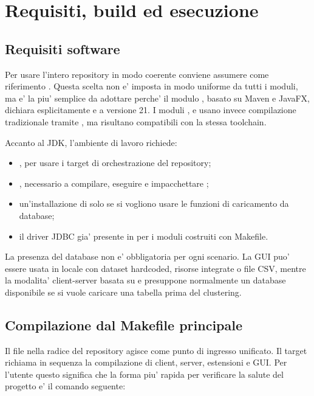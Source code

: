 \chapter{Requisiti, build ed esecuzione}
\label{chap:build}

\section{Requisiti software}

Per usare l'intero repository in modo coerente conviene assumere come riferimento
. Questa scelta non e' imposta in modo uniforme da tutti i moduli, ma e'
la piu' semplice da adottare perche' il modulo , basato su Maven e JavaFX,
dichiara esplicitamente  e  a versione 21. I moduli
,  e  usano invece compilazione
tradizionale tramite , ma risultano compatibili con la stessa toolchain.

Accanto al JDK, l'ambiente di lavoro richiede:

\begin{itemize}
  \item {}, per usare i target di orchestrazione del repository;
  \item {}, necessario a compilare, eseguire e impacchettare ;
  \item un'installazione di  solo se si vogliono usare le funzioni di
    caricamento da database;
  \item il driver JDBC gia' presente in
     per i moduli costruiti con Makefile.
\end{itemize}

La presenza del database non e' obbligatoria per ogni scenario. La GUI puo' essere usata
in locale con dataset hardcoded, risorse integrate o file CSV, mentre la modalita'
client-server basata su  e  presuppone normalmente un
database disponibile se si vuole caricare una tabella prima del clustering.

\section{Compilazione dal Makefile principale}

Il file  nella radice del repository agisce come punto di ingresso
unificato. Il target  richiama in sequenza la compilazione di client, server,
estensioni e GUI. Per l'utente questo significa che la forma piu' rapida per verificare
la salute del progetto e' il comando seguente:

